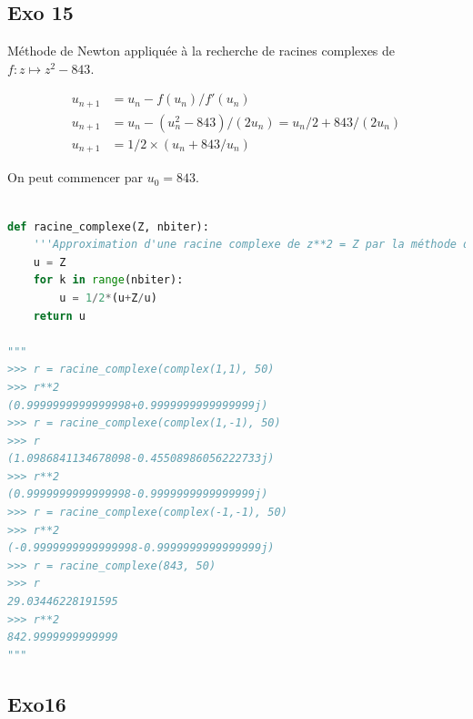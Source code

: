 \documentclass[
  11pt,
]{article}
\newcounter{exo}
\newcounter{def}
\begin{document}
\hypertarget{exo-15}{%
\subsection{Exo 15}\label{exo-15}}

Méthode de Newton appliquée à la recherche de racines complexes de
\(f:z \mapsto z^2 - 843\).

\begin{align*}
u_{n+1} &= u_{n} - f(u_{n})/f'(u_{n}) \\
u_{n+1} &= u_{n} - (u^{2}_n - 843)/(2u_{n}) =  u_{n}/2 + 843/(2u_{n}) \\
u_{n+1} &= 1/2 \times (u_{n}+843/u_{n})
\end{align*}

On peut commencer par \(u_{0}=843\).

\begin{lstlisting}[language=Python]

def racine_complexe(Z, nbiter):
    '''Approximation d'une racine complexe de z**2 = Z par la méthode de Newton'''
    u = Z
    for k in range(nbiter):
        u = 1/2*(u+Z/u)
    return u

"""
>>> r = racine_complexe(complex(1,1), 50)
>>> r**2
(0.9999999999999998+0.9999999999999999j)
>>> r = racine_complexe(complex(1,-1), 50)
>>> r
(1.0986841134678098-0.45508986056222733j)
>>> r**2
(0.9999999999999998-0.9999999999999999j)
>>> r = racine_complexe(complex(-1,-1), 50)
>>> r**2
(-0.9999999999999998-0.9999999999999999j)
>>> r = racine_complexe(843, 50)
>>> r
29.03446228191595
>>> r**2
842.9999999999999
"""
\end{lstlisting}

\hypertarget{exo16}{%
\subsection{Exo16}\label{exo16}}
\end{document}
